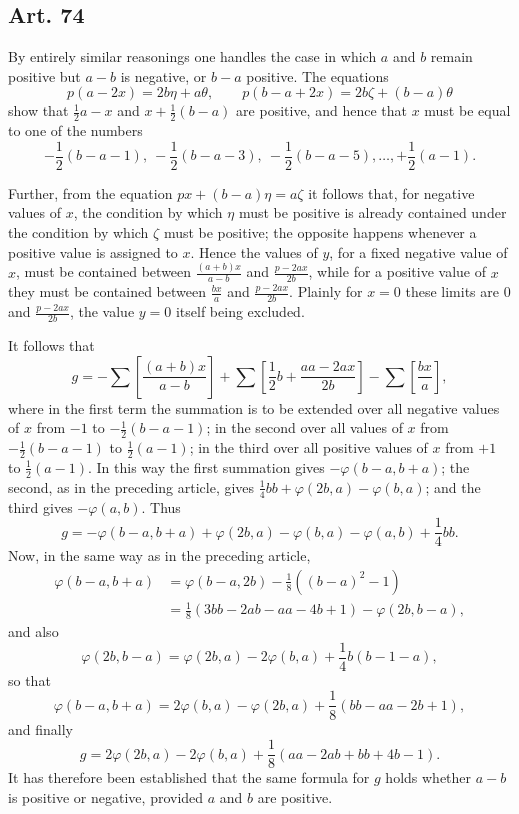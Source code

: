 \documentclass[12pt]{article}
\newcommand{\art}[1]{\subsection*{Art. #1}}
\newcommand{\gbrack}[1]{\left[#1\right]}
\begin{document}
\art{74}
By entirely similar reasonings one handles the case in which $a$ and $b$ remain positive but $a-b$ is negative, or $b-a$ positive. The equations
\[
p(a-2x)=2b\eta+a\theta,\qquad
p(b-a+2x)=2b\zeta+(b-a)\theta
\]
show that $\frac12a-x$ and $x+\frac12(b-a)$ are positive, and hence that $x$ must be equal to one of the numbers
\[
-\frac12(b-a-1),\ -\frac12(b-a-3),\ -\frac12(b-a-5),\ldots,+\frac12(a-1).
\]

Further, from the equation $px+(b-a)\eta=a\zeta$ it follows that, for negative values of $x$, the condition by which $\eta$ must be positive is already contained under the condition by which $\zeta$ must be positive; the opposite happens whenever a positive value is assigned to $x$. Hence the values of $y$, for a fixed negative value of $x$, must be contained between $\frac{(a+b)x}{a-b}$ and $\frac{p-2ax}{2b}$, while for a positive value of $x$ they must be contained between $\frac{bx}{a}$ and $\frac{p-2ax}{2b}$. Plainly for $x=0$ these limits are $0$ and $\frac{p-2ax}{2b}$, the value $y=0$ itself being excluded.

It follows that
\[
g=-\sum\gbrack{\frac{(a+b)x}{a-b}}
+\sum\gbrack{\frac12b+\frac{aa-2ax}{2b}}
-\sum\gbrack{\frac{bx}{a}},
\]
where in the first term the summation is to be extended over all negative values of $x$ from $-1$ to $-\frac12(b-a-1)$; in the second over all values of $x$ from $-\frac12(b-a-1)$ to $\frac12(a-1)$; in the third over all positive values of $x$ from $+1$ to $\frac12(a-1)$. In this way the first summation gives $-\varphi(b-a,b+a)$; the second, as in the preceding article, gives $\frac14bb+\varphi(2b,a)-\varphi(b,a)$; and the third gives $-\varphi(a,b)$. Thus
\[
g=-\varphi(b-a,b+a)+\varphi(2b,a)-\varphi(b,a)-\varphi(a,b)+\frac14bb.
\]
Now, in the same way as in the preceding article,
\[
\begin{aligned}
\varphi(b-a,b+a)
&=\varphi(b-a,2b)-\frac18((b-a)^2-1)\\
&=\frac18(3bb-2ab-aa-4b+1)-\varphi(2b,b-a),
\end{aligned}
\]
and also
\[
\varphi(2b,b-a)=\varphi(2b,a)-2\varphi(b,a)+\frac14b(b-1-a),
\]
so that
\[
\varphi(b-a,b+a)=2\varphi(b,a)-\varphi(2b,a)+\frac18(bb-aa-2b+1),
\]
and finally
\[
g=2\varphi(2b,a)-2\varphi(b,a)+\frac18(aa-2ab+bb+4b-1).
\]
It has therefore been established that the same formula for $g$ holds whether $a-b$ is positive or negative, provided $a$ and $b$ are positive.
\end{document}
